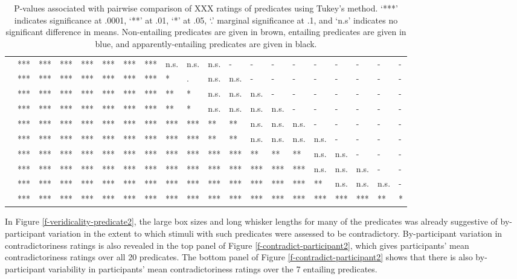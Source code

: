 \documentclass[11pt,fleqn]{article}
\newcommand{\6}{\mbox{$[\hspace*{-.6mm}[$}}
\newcommand{\9}{\mbox{$]\hspace*{-.6mm}]$}}
\begin{document}
\begin{landscape}
\begin{table}[h!]
\begin{tabular}{l l l l l l l l l l l l l l l l l l l l }
\color{black}{\em acknowledge}\color{black}	& *** & *** & *** & *** & *** & *** & *** & n.s. & n.s. & n.s. & - & - & - & - & - & - & - & - & - \\
\color{black}{\em admit}\color{black}			& *** & *** & *** & *** & *** & *** & *** & * & . & n.s. & n.s. & - & - & - & - & - & - & - & - \\
\color{blue}{\em establish}\color{black}		& *** & *** & *** & *** & *** & *** & *** & ** & * & n.s. & n.s. &  n.s. & - & - & - & - & - & - & - \\
\color{black}{\em demonstrate}\color{black}	& *** & *** & *** & *** & *** & *** & *** & ** & * & n.s. & n.s. & n.s. & n.s. & - & - & - & - & - & - \\
\color{black}{\em confirm}\color{black}		& *** & *** & *** & *** & *** & *** & *** & *** & *** & ** & ** & n.s. & n.s. & n.s. & - & - & - & - & - \\
\color{blue}{\em discover}\color{black}		& *** & *** & *** & *** & *** & *** & *** & *** & *** & ** & ** & n.s. & n.s. & n.s. & n.s. & - & - & - & - \\
\color{blue}{\em see}\color{black}			& *** & *** & *** & *** & *** & *** & *** & *** & *** & *** & *** & ** & ** & ** & n.s. & n.s. & - & - & - \\
\color{blue}{\em know}\color{black}			& *** & *** & *** & *** & *** & *** & *** & *** & *** & *** & *** & *** & *** & *** & n.s. & n.s. & n.s. & - & - \\
\color{black}{\em prove}\color{black}			& *** & *** & *** & *** & *** & *** & *** & *** & *** & *** & *** & *** & *** & *** & ** & n.s. & n.s. & n.s. & -  \\
\color{blue}{\em be right}\color{black}		& *** & *** & *** & *** & *** & *** & *** & *** & ***  & ***  & *** & *** & *** & *** & *** & *** & *** & ** & *  \\

\bottomrule
\end{tabular}
\caption{P-values associated with pairwise comparison of XXX ratings of predicates using Tukey's method. `***' indicates significance at .0001, `**' at .01, `*' at .05, `.' marginal significance at .1, and `n.s' indicates no significant difference in means. Non-entailing predicates are given in brown, entailing predicates are given in blue, and apparently-entailing predicates are given in black.}\label{t-pairwise2}
\end{table}
\end{landscape}

In Figure \ref{f-veridicality-predicate2}, the large box sizes and long whisker lengths for many of the predicates was already suggestive of by-participant variation in the extent to which stimuli with such predicates were assessed to be contradictory. By-participant variation in contradictoriness ratings is also revealed in the top panel of Figure \ref{f-contradict-participant2}, which gives participants' mean contradictoriness ratings over all 20 predicates. The bottom panel of Figure \ref{f-contradict-participant2} shows that there is also by-participant variability in participants' mean contradictoriness ratings over the 7 entailing predicates.
\end{document}
